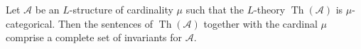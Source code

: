 Let $\mathcal{A}$ be an $L$-structure of cardinality $\mu$ such that the $L$-theory $\operatorname{Th}(\mathcal{A})$ is $\mu$-categorical. Then the sentences of $\operatorname{Th}(\mathcal{A})$ together with the cardinal $\mu$ comprise a complete set of invariants for $\mathcal{A}$.
